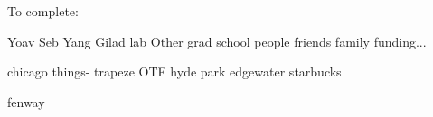 \acknowledgments


To complete:

Yoav
Seb
Yang
Gilad lab
Other grad school people 
friends 
family
funding...

chicago things- 
trapeze
OTF hyde park 
edgewater starbucks 

fenway